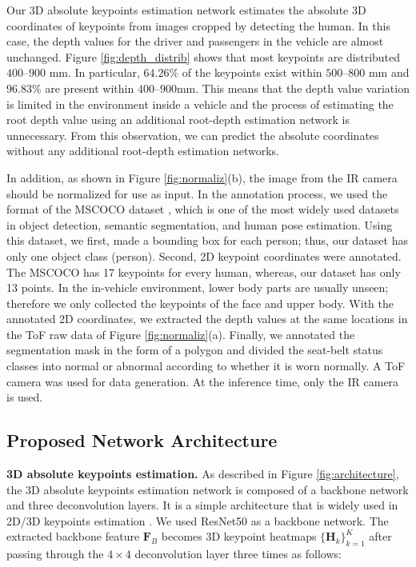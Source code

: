 \documentclass[letterpaper]{article} %
\begin{document}
Our 3D absolute keypoints estimation network estimates the absolute 3D coordinates of keypoints from images cropped by detecting the human. In this case, the depth values for the driver and passengers in the vehicle are almost unchanged. Figure \ref{fig:depth_distrib} shows that most keypoints are distributed $400$--$900$ mm. In particular, $64.26\%$ of the keypoints exist within $500$--$800$ mm and $96.83\%$ are present within $400$--$900$mm. This means that the depth value variation is limited in the environment inside a vehicle and the process of estimating the root depth value using an additional root-depth estimation network is unnecessary. From this observation, we can predict the absolute coordinates without any additional root-depth estimation networks.

In addition, as shown in Figure \ref{fig:normaliz}(b), the image from the IR camera should be normalized for use as input. In the annotation process, we used the format of the MSCOCO dataset \cite{lin2014microsoft}, which is one of the most widely used datasets in object detection, semantic segmentation, and human pose estimation. Using this dataset, we first, made a bounding box for each person; thus, our dataset has only one object class (person). Second, 2D keypoint coordinates were annotated. The MSCOCO has 17 keypoints for every human, whereas, our dataset has only 13 points.
In the in-vehicle environment, lower body parts are usually unseen; therefore we only collected the keypoints of the face and upper body. With the annotated 2D coordinates, we extracted the depth values at the same locations in the ToF raw data of Figure \ref{fig:normaliz}(a). Finally, we annotated the segmentation mask in the form of a polygon and divided the seat-belt status classes into normal or abnormal according to whether it is worn normally. A ToF camera was used for data generation. At the inference time, only the IR camera is used.

\subsection{Proposed Network Architecture}
\textbf{3D absolute keypoints estimation.} As described in Figure \ref{fig:architecture}, the 3D absolute keypoints estimation network is composed of a backbone network and three deconvolution layers. It is a simple architecture that is widely used in 2D/3D keypoints estimation \cite{xiao2018simple, moon2019camera}. We used ResNet50 \cite{he2016identity} as a backbone network. The extracted backbone feature $\textbf{F}_{B}$ becomes 3D keypoint heatmaps $\{{\mathbf H}_{k}\}_{k=1}^{K}$ after passing through the $4\times4$ deconvolution layer three times as follows:
\end{document}
